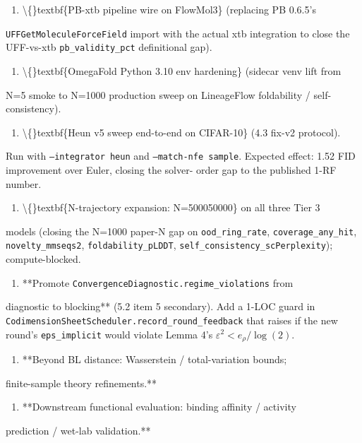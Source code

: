 \documentclass[preprint,3p,times,twocolumn]{elsarticle}
\begin{document}
\begin{enumerate}
\item \textbackslash\{\}textbf\{PB-xtb pipeline wire on FlowMol3\} (replacing PB 0.6.5's
\end{enumerate}
\texttt{UFFGetMoleculeForceField} import with the actual xtb integration to close the UFF-vs-xtb \texttt{pb\_validity\_pct} definitional gap).

\begin{enumerate}
\item \textbackslash\{\}textbf\{OmegaFold Python 3.10 env hardening\} (sidecar venv lift from
\end{enumerate}
N=5 smoke to N=1000 production sweep on LineageFlow foldability / self-consistency).

\begin{enumerate}
\item \textbackslash\{\}textbf\{Heun v5 sweep end-to-end on CIFAR-10\} (4.3 fix-v2 protocol).
\end{enumerate}
Run with \texttt{--integrator heun} and \texttt{--match-nfe sample}. Expected effect: 1.52 FID improvement over Euler, closing the solver- order gap to the published 1-RF number.

\begin{enumerate}
\item \textbackslash\{\}textbf\{N-trajectory expansion: N=500050000\} on all three Tier 3
\end{enumerate}
models (closing the N=1000  paper-N gap on \texttt{ood\_ring\_rate}, \texttt{coverage\_any\_hit}, \texttt{novelty\_mmseqs2}, \texttt{foldability\_pLDDT}, \texttt{self\_consistency\_scPerplexity}); compute-blocked.

\begin{enumerate}
\item **Promote \texttt{ConvergenceDiagnostic.regime\_violations} from
\end{enumerate}
diagnostic to blocking** (5.2 item 5 secondary). Add a 1-LOC guard in \texttt{CodimensionSheetScheduler.record\_round\_feedback} that raises if the new round's \texttt{eps\_implicit} would violate Lemma 4's $\varepsilon^2 < e_\rho / \log(2)$.

\begin{enumerate}
\item **Beyond BL distance: Wasserstein / total-variation bounds;
\end{enumerate}
finite-sample theory refinements.**

\begin{enumerate}
\item **Downstream functional evaluation: binding affinity / activity
\end{enumerate}
prediction / wet-lab validation.**
\end{document}

